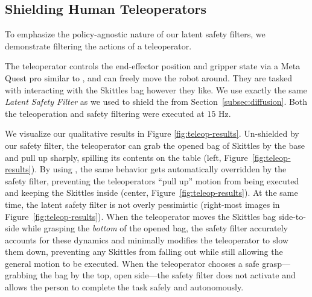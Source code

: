 

\subsection{Shielding Human Teleoperators}


To emphasize the policy-agnostic nature of our latent safety filters, we demonstrate filtering the actions of a teleoperator.

 The teleoperator controls the end-effector position and gripper state via a Meta Quest pro similar to \cite{khazatsky2024droid}, and can freely move the robot around. They are tasked with interacting with the Skittles bag however they like. We use exactly the same  \textit{Latent Safety Filter} as we used to shield the \diffpolicy from Section~\ref{subsec:diffusion}. Both the teleoperation and safety filtering were executed at $15$ Hz.

We visualize our qualitative results in Figure \ref{fig:teleop-results}. 
Un-shielded by our safety filter, the teleoperator can grab the opened bag of Skittles by the base and pull up sharply, spilling its contents on the table (left, Figure~\ref{fig:teleop-results}). 
By using \ours, the same behavior gets automatically overridden by the safety filter, preventing the teleoperators ``pull up'' motion from being executed and keeping the Skittles inside (center, Figure~\ref{fig:teleop-results}). 
At the same time, the latent safety filter is not overly pessimistic (right-most images in Figure~\ref{fig:teleop-results}). 
When the teleoperator moves the Skittles bag side-to-side while grasping the \textit{bottom} of the opened bag, the safety filter accurately accounts for these dynamics and minimally modifies the teleoperator to slow them down, preventing any Skittles from falling out while still allowing the general motion to be executed. 
When the teleoperator chooses a safe grasp---grabbing the bag by the top, open side---the safety filter does not activate and allows the person to complete the task safely and autonomously. 
